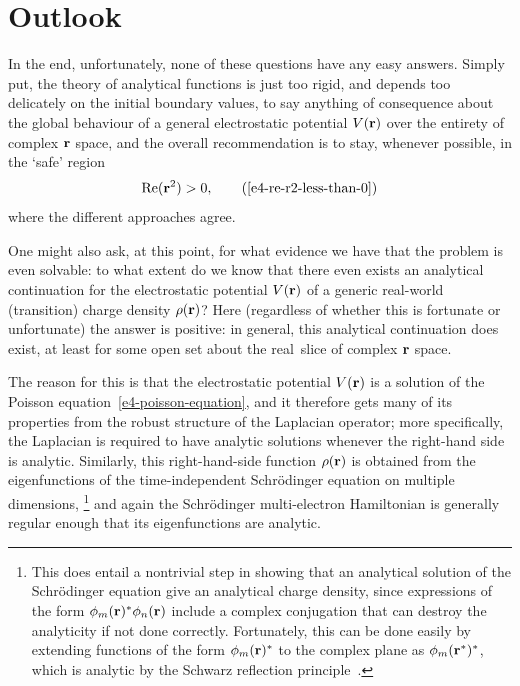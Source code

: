 \section{Outlook}
In the end, unfortunately, none of these questions have any easy answers. Simply put, the theory of analytical functions is just too rigid, and depends too delicately on the initial boundary values, to say anything of consequence about the global behaviour of a general electrostatic potential $V(\vb{r})$ over the entirety of complex $\vb{r}$ space, and the overall recommendation is to stay, whenever possible, in the `safe' region
\begin{equation}
\Re(\vbr^2)>0,
\backtag{e4-re-r2-less-than-0}
\end{equation}
where the different approaches agree.

One might also ask, at this point, for what evidence we have that the problem is even solvable: to what extent do we know that there even exists an analytical continuation for the electrostatic potential $V(\vb{r})$ of a generic real-world (transition) charge density $\rho(\vb{r})$? Here (regardless of whether this is fortunate or unfortunate) the answer is positive: in general, this analytical continuation does exist, at least for some open set about the real~slice of complex $\vb{r}$ space.


The reason for this is that the electrostatic potential $V(\vb{r})$ is a solution of the Poisson equation~\eqref{e4-poisson-equation}, and it therefore gets many of its properties from the robust structure of the Laplacian operator; more specifically, the Laplacian is required to have analytic solutions whenever the right-hand side is analytic. Similarly, this right-hand-side function $\rho(\vb{r})$ is obtained from the eigenfunctions of the time-independent Schrödinger equation on multiple dimensions,%
\footnote{%
This does entail a nontrivial step in showing that an analytical solution of the Schrödinger equation give an analytical charge density, since expressions of the form $\phi_m(\vb{r})^* \phi_n(\vb{r})$ include a complex conjugation that can destroy the analyticity if not done correctly. Fortunately, this can be done easily by extending functions of the form $\phi_m(\vb{r})^*$ to the complex plane as $\phi_m(\vb{r}^*)^*$, which is analytic by the Schwarz reflection principle~\cite[p.~119-120]{noguchi_complex_analysis}.
}
and again the Schrödinger multi-electron Hamiltonian is generally regular enough that its eigenfunctions are analytic.



